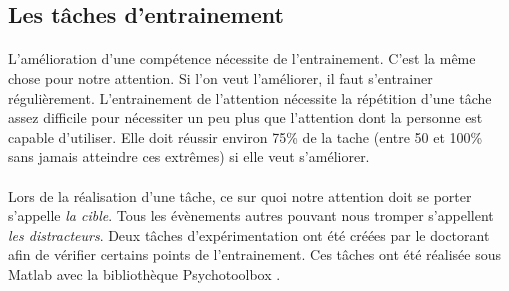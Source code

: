 





\newpage
\subsection{Les tâches d'entrainement}
\label{TrainingSection}

\paragraph{}L'amélioration d'une compétence nécessite de l'entrainement. C'est la même chose pour notre attention. Si l'on veut l'améliorer, il faut s'entrainer régulièrement.
L'entrainement de l'attention nécessite la répétition d'une tâche assez difficile pour nécessiter un peu plus que l'attention dont la personne est capable d'utiliser. Elle doit réussir
environ 75\% de la tache (entre 50 et 100\% sans jamais atteindre ces extrêmes) si elle veut s'améliorer.

\paragraph{}Lors de la réalisation d'une tâche, ce sur quoi notre attention doit se porter s'appelle \emph{la cible}. Tous les évènements autres pouvant nous tromper s'appellent
\emph{les distracteurs}. Deux tâches d'expérimentation ont été créées par le doctorant  afin de vérifier certains points de l'entrainement. Ces tâches ont été
réalisée sous \gls{Matlab} avec la bibliothèque \gls{Psychotoolbox} .




 \newpage




\newpage